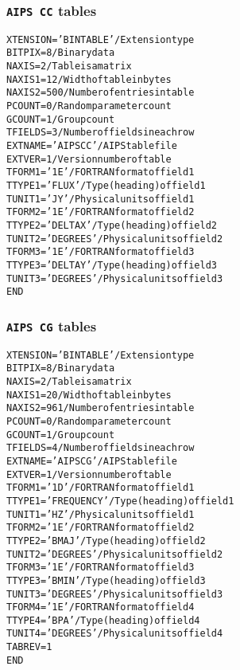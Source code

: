 \documentclass[twoside]{article}
\begin{document}
\subsubsection{{\tt AIPS CC} tables}
\label{Appe:CCtable}
\begin{alltt}
XTENSION= 'BINTABLE'           / Extension type
BITPIX  =                    8 / Binary data
NAXIS   =                    2 / Table is a matrix
NAXIS1  =                   12 / Width of table in bytes
NAXIS2  =                  500 / Number of entries in table
PCOUNT  =                    0 / Random parameter count
GCOUNT  =                    1 / Group count
TFIELDS =                    3 / Number of fields in each row
EXTNAME = 'AIPS CC '           / AIPS table file
EXTVER  =                    1 / Version number of table
TFORM1  = '1E      '           / FORTRAN format of field  1
TTYPE1  = 'FLUX            '   / Type (heading) of field  1
TUNIT1  = 'JY      '           / Physical units of field  1
TFORM2  = '1E      '           / FORTRAN format of field  2
TTYPE2  = 'DELTAX          '   / Type (heading) of field  2
TUNIT2  = 'DEGREES '           / Physical units of field  2
TFORM3  = '1E      '           / FORTRAN format of field  3
TTYPE3  = 'DELTAY          '   / Type (heading) of field  3
TUNIT3  = 'DEGREES '           / Physical units of field  3
END
\end{alltt}

\subsubsection{{\tt AIPS CG} tables}
\label{Appe:CGtable}
\begin{alltt}
XTENSION= 'BINTABLE'           / Extension type
BITPIX  =                    8 / Binary data
NAXIS   =                    2 / Table is a matrix
NAXIS1  =                   20 / Width of table in bytes
NAXIS2  =                  961 / Number of entries in table
PCOUNT  =                    0 / Random parameter count
GCOUNT  =                    1 / Group count
TFIELDS =                    4 / Number of fields in each row
EXTNAME = 'AIPS CG '           / AIPS table file
EXTVER  =                    1 / Version number of table
TFORM1  = '1D      '           / FORTRAN format of field  1
TTYPE1  = 'FREQUENCY       '   / Type (heading) of field  1
TUNIT1  = 'HZ      '           / Physical units of field  1
TFORM2  = '1E      '           / FORTRAN format of field  2
TTYPE2  = 'BMAJ            '   / Type (heading) of field  2
TUNIT2  = 'DEGREES '           / Physical units of field  2
TFORM3  = '1E      '           / FORTRAN format of field  3
TTYPE3  = 'BMIN            '   / Type (heading) of field  3
TUNIT3  = 'DEGREES '           / Physical units of field  3
TFORM4  = '1E      '           / FORTRAN format of field  4
TTYPE4  = 'BPA             '   / Type (heading) of field  4
TUNIT4  = 'DEGREES '           / Physical units of field  4
TABREV  =            1
END
\end{alltt}
\end{document}
